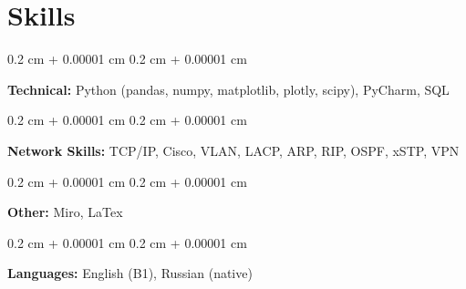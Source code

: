 \documentclass[10pt, letterpaper]{article}
\newenvironment{highlights}{
    \begin{itemize}[
        topsep=0.10 cm,
        parsep=0.10 cm,
        partopsep=0pt,
        itemsep=0pt,
        leftmargin=0.4 cm + 10pt
    ]
}{
    \end{itemize}
} %
\newenvironment{onecolentry}{
    \begin{adjustwidth}{
        0.2 cm + 0.00001 cm
    }{
        0.2 cm + 0.00001 cm
    }
}{
    \end{adjustwidth}
} %
\let\hrefWithoutArrow\href
\renewcommand{\href}[2]{\hrefWithoutArrow{#1}{\ifthenelse{\equal{#2}{}}{ }{#2 }\raisebox{.15ex}{\footnotesize \faExternalLink*}}}
\begin{document}
            

    
    \section{Skills}

        \begin{onecolentry}
            \textbf{Technical:} Python (pandas, numpy, matplotlib, plotly, scipy), PyCharm, SQL
        \end{onecolentry}

        \begin{onecolentry}
            \textbf{Network Skills:} TCP/IP, Cisco, VLAN, LACP, ARP, RIP, OSPF, xSTP, VPN
        \end{onecolentry}

        \begin{onecolentry}
            \textbf{Other:}  Miro, LaTex
        \end{onecolentry}

        \begin{onecolentry}
            \textbf{Languages:} English (B1), Russian (native)
        \end{onecolentry}
\end{document}

